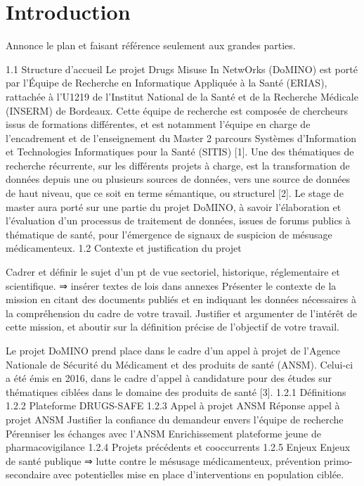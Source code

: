 \documentclass[a4paper, 11pt, openany, oneside, abstract=on]{report}
\begin{document}
\chapter{Introduction}
\begin{it}Annonce le plan et faisant référence seulement aux grandes parties.\end{it}
1.1 Structure d'accueil
Le projet Drugs Misuse In NetwOrks (DoMINO) est porté par l'Équipe de Recherche en Informatique Appliquée à la Santé (ERIAS), rattachée à l'U1219 de l'Institut National de la Santé et de la Recherche Médicale (INSERM) de Bordeaux. Cette équipe de recherche est composée de chercheurs issus de formations différentes, et est notamment l'équipe en charge de l'encadrement et de l'enseignement du Master 2 parcours Systèmes d’Information et Technologies Informatiques pour la Santé (SITIS) [1]. Une des thématiques de recherche récurrente, sur les différents projets à charge, est la transformation de données depuis une ou plusieurs sources de données, vers une source de données de haut niveau, que ce soit en terme sémantique, ou structurel [2]. 
Le stage de master aura porté sur une partie du projet DoMINO, à savoir l'élaboration et l'évaluation d'un processus de traitement de données, issues de forums publics à thématique de santé, pour l'émergence de signaux de suspicion de mésusage médicamenteux.
1.2 Contexte et justification du projet
\begin{it}Cadrer et définir le sujet d’un pt de vue sectoriel, historique, réglementaire et scientifique.
⇒ insérer textes de lois dans annexes
Présenter le contexte de la mission en citant des documents publiés et en indiquant les données nécessaires à la compréhension du cadre de votre travail.
Justifier et argumenter de l’intérêt de cette mission, et aboutir sur la définition précise de l’objectif de votre travail.\end{it}
Le projet DoMINO prend place dans le cadre d'un appel à projet de l'Agence Nationale de Sécurité du Médicament et des produits de santé (ANSM). Celui-ci a été émis en 2016, dans le cadre d'appel à candidature pour des études sur thématiques ciblées dans le domaine des produits de santé [3].
1.2.1 Définitions
1.2.2 Plateforme DRUGS-SAFE
1.2.3 Appel à projet ANSM
Réponse appel à projet ANSM
Justifier la confiance du demandeur envers l’équipe de recherche
Pérenniser les échanges avec l’ANSM
Enrichissement plateforme jeune de pharmacovigilance
1.2.4 Projets précédents et cooccurrents
1.2.5 Enjeux
Enjeux de santé publique ⇒ lutte contre le mésusage médicamenteux, prévention primo-secondaire avec potentielles mise en place d’interventions en population ciblée.
\end{document}
